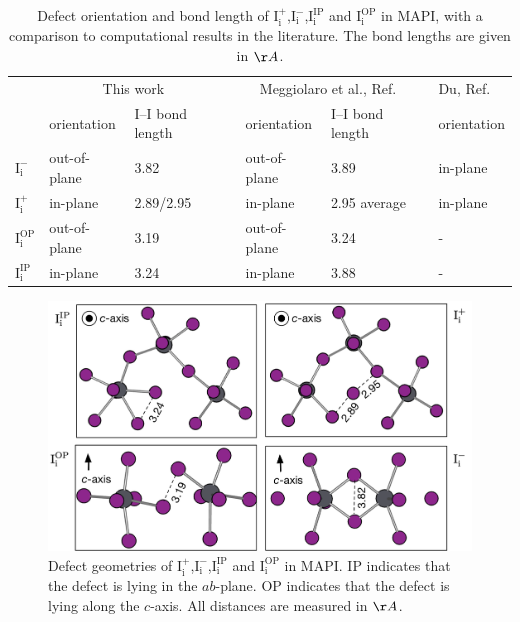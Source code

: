 \begin{table}[h!]\centering
\begin{tabular}{llllllll}\toprule
\phantom{abcd}&\multicolumn{2}{c}{This work} &\phantom{a} &\multicolumn{2}{c}{Meggiolaro et al., Ref. \cite{Meggiolaro2018}}&\phantom{a} & Du, Ref. \cite{Du2015} \\
\cline{2-3} \cline{5-6} \cline{8-8}
& orientation & I--I bond length && orientation & I--I bond length  && orientation \\  
\midrule
$\mathrm{I}_\mathrm{i}^-$ &  out-of-plane & 3.82  &&  out-of-plane & 3.89 && in-plane \\
$\mathrm{I}_\mathrm{i}^+$ & in-plane & 2.89/2.95 && in-plane & 2.95 average && in-plane \\
$\mathrm{I}_\mathrm{i}^\mathrm{OP}$ & out-of-plane & 3.19 && out-of-plane & 3.24 && - \\
$\mathrm{I}_\mathrm{i}^\mathrm{IP}$ & in-plane & 3.24 && in-plane & 3.88 && - \\
\end{tabular} 
\caption[Defect orientation and bond length of $\mathrm{I}_\mathrm{i}^+$, $\mathrm{I}_\mathrm{i}^-$, $\mathrm{I}_\mathrm{i}^\mathrm{IP}$ $\mathrm{I}_\mathrm{i}^\mathrm{OP}$]{\label{compare_geoms}Defect orientation and bond length of $\mathrm{I}_\mathrm{i}^+$,$\mathrm{I}_\mathrm{i}^-$,$\mathrm{I}_\mathrm{i}^\mathrm{IP}$ and $\mathrm{I}_\mathrm{i}^\mathrm{OP}$ in MAPI, with a comparison to computational results in the literature. The bond lengths are given in $\AA$.}
\end{table}

\begin{figure}[h!]
\centering
  \includegraphics[width=1.0\columnwidth]{figures/ch6/defect_geometries.png}
  \caption[Defect geometries of $\mathrm{I}_\mathrm{i}^+$,$\mathrm{I}_\mathrm{i}^-$,$\mathrm{I}_\mathrm{i}^\mathrm{IP}$ and $\mathrm{I}_\mathrm{i}^\mathrm{OP}$]{Defect geometries of $\mathrm{I}_\mathrm{i}^+$,$\mathrm{I}_\mathrm{i}^-$,$\mathrm{I}_\mathrm{i}^\mathrm{IP}$ and $\mathrm{I}_\mathrm{i}^\mathrm{OP}$ in MAPI. IP indicates that the defect is lying in the $ab$-plane. OP indicates that the defect is lying along the $c$-axis. All distances are measured in $\AA$.}
\label{relaxation_workflow}
\end{figure}

